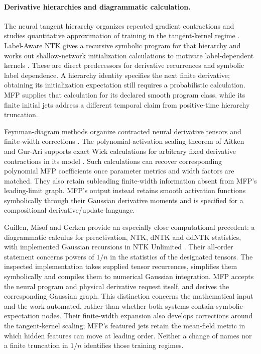 \paragraph{Derivative hierarchies and diagrammatic calculation.}
The neural tangent hierarchy organizes repeated gradient contractions and
studies quantitative approximation of training in the tangent-kernel regime
\cite{huang2020nth}. Label-Aware NTK gives a recursive symbolic program for
that hierarchy and works out shallow-network initialization calculations to
motivate label-dependent kernels \cite{chen2020lantk}. These are direct
predecessors for derivative recurrences and symbolic label dependence. A
hierarchy identity specifies the next finite derivative; obtaining its
initialization expectation still requires a probabilistic calculation. MFP
supplies that calculation for its declared smooth program class, while its
finite initial jets address a different temporal claim from positive-time
hierarchy truncation.

Feynman-diagram methods organize contracted neural derivative tensors and
finite-width corrections \cite{dyer2019feynman}. The polynomial-activation
scaling theorem of Aitken and Gur-Ari supports exact Wick calculations for
arbitrary fixed derivative contractions in its model
\cite{aitken2020nonlinear}. Such calculations can recover corresponding
polynomial MFP coefficients once parameter metrics and width factors are
matched. They also retain subleading finite-width information absent from
MFP's leading-limit graph. MFP's output instead retains smooth activation
functions symbolically through their Gaussian derivative moments and is
specified for a compositional derivative/update language.

Guillen, Misof and Gerken provide an especially close computational precedent:
a diagrammatic calculus for preactivation, NTK, dNTK and ddNTK statistics,
with implemented Gaussian recursions in NTK Unlimited \cite{guillen2026finite}.
Their all-order statement concerns powers of $1/n$ in the statistics of the
designated tensors. The inspected implementation takes supplied tensor
recurrences, simplifies them symbolically and compiles them to numerical
Gaussian integration. MFP accepts the neural program and physical derivative
request itself, and derives the corresponding Gaussian graph. This distinction
concerns the mathematical input and the work automated, rather than whether
both systems contain symbolic expectation nodes. Their finite-width expansion
also develops corrections around the tangent-kernel scaling; MFP's featured
jets retain the mean-field metric in which hidden features can move at leading
order. Neither a change of names nor a finite truncation in $1/n$ identifies
those training regimes.

